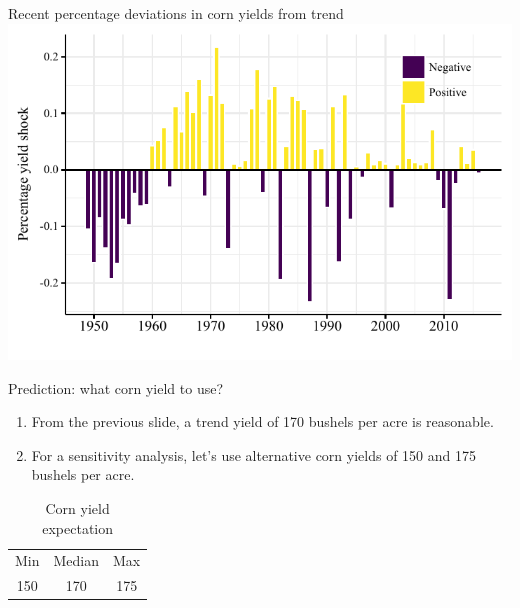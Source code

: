 \documentclass[table,xcolor=pdftex,dvipsnames, handout]{beamer}\usepackage[]{graphicx}\usepackage[]{color}
\makeatletter
\def\maxwidth{ %
  \ifdim\Gin@nat@width>\linewidth
    \linewidth
  \else
    \Gin@nat@width
  \fi
}
\newenvironment{knitrout}{}{} %
\makeatother
\begin{document}

\begin{frame}{Recent percentage deviations in corn yields from trend}
\begin{knitrout}
\color{fgcolor}
\includegraphics[width=\maxwidth]{figure/figure_percent-1} 

\end{knitrout}
\end{frame}


\begin{frame}{Prediction: what corn yield to use?}
\begin{enumerate}[label=\textbullet]
  \item From the previous slide, a trend yield of 170 bushels per acre is reasonable.
  \item For a sensitivity analysis, let's use alternative corn yields of 150 and 175 bushels per acre.
\end{enumerate}
\begin{table}
\caption{Corn yield expectation}
\begin{tabular}{c c c}
  \toprule
   Min & Median & Max \\
   150 & 170 & 175\\
  \bottomrule
\end{tabular}
\end{table}
\end{frame}

\end{document}
